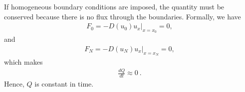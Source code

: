 \begin{questions}
\begin{solution}
\end{solution}


\begin{solution}

If homogeneous boundary conditions are imposed, the quantity must be conserved because there is no flux through the boundaries. Formally, we have
\begin{align*}
F_0 = -D(u_0)u_x|_{x=x_0} = 0,
\end{align*}
and
\begin{align*}
F_N = -D(u_N)u_x|_{x=x_N}=0,
\end{align*}
which makes
\begin{align*}
\frac{dQ}{dt} \approx 0~.
\end{align*}
Hence, $Q$ is constant in time.
\end{solution}
\end{questions}
